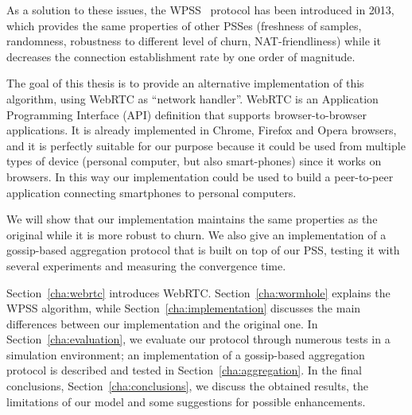 As a solution to these issues, the \ac{WPSS}~\cite{wormhole} protocol has been introduced in 2013, which provides the same properties of other PSSes (freshness of samples, randomness, robustness to different level of churn, NAT-friendliness) while it decreases the connection establishment rate by one order of magnitude. 

The goal of this thesis is to provide an alternative implementation of this algorithm, using WebRTC as ``network handler''. WebRTC is an Application Programming Interface (API) definition that supports browser-to-browser applications. It is already implemented in Chrome, Firefox and Opera browsers, and it is perfectly suitable for our purpose because it could be used from multiple types of device (personal computer, but also smart-phones) since it works on browsers. In this way our implementation could be used to build a peer-to-peer application connecting smartphones to  personal computers.

We will show that our implementation maintains the same properties as the original while it is more robust to churn. We also give an implementation of a gossip-based aggregation protocol that is built on top of our PSS, testing it with several experiments and measuring the convergence time.

Section~\ref{cha:webrtc} introduces WebRTC. Section~\ref{cha:wormhole} explains the \ac{WPSS} algorithm, while Section~\ref{cha:implementation} discusses the main differences between our implementation and the original one. In Section~\ref{cha:evaluation}, we evaluate our protocol through numerous tests in a simulation environment; an implementation of a gossip-based aggregation protocol is described and tested in Section~\ref{cha:aggregation}. In the final conclusions, Section~\ref{cha:conclusions}, we discuss the obtained results, the limitations of our model and some suggestions for possible enhancements.
